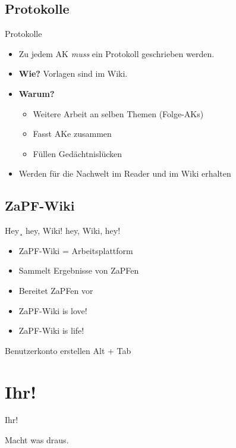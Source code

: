 \documentclass[compress,]{beamer}
\begin{document}

\subsection{Protokolle}

\begin{frame}{Protokolle}

  \begin{itemize}
  \item<1-> Zu jedem AK \emph{muss} ein Protokoll geschrieben werden.
  \item<2-> \textbf{Wie?} Vorlagen sind im Wiki.

  \item<4-> \textbf{Warum?}
    \begin{itemize}
    \item<5-> Weitere Arbeit an selben Themen (Folge-AKs)
    \item<6-> Fasst AKe zusammen
    \item<7-> Füllen Gedächtnislücken
    \end{itemize}
  \item<8-> Werden für die Nachwelt im Reader und im Wiki erhalten
  \end{itemize}

\end{frame}


\subsection{ZaPF-Wiki}

\begin{frame}{Hey¸ hey, Wiki! hey, Wiki, hey!}

  \begin{itemize}[<+->]
  \item ZaPF-Wiki = Arbeitsplattform
  \item Sammelt Ergebnisse von ZaPFen
  \item Bereitet ZaPFen vor
  \item \Huge{ZaPF-Wiki is love!}
  \item \Huge{ZaPF-Wiki is life!}
  \end{itemize}

\end{frame}

\begin{frame}{Benutzerkonto erstellen}
  \centering
  \Huge{Alt + Tab}

\end{frame}


\section{Ihr!}

\begin{frame}{Ihr!}

  Macht was draus.

\end{frame}
\end{document}
